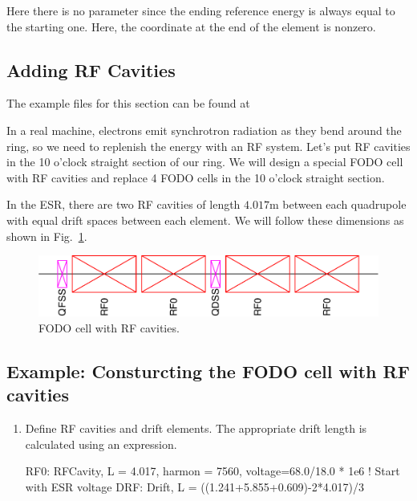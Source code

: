 \documentclass{hitec}     %
\begin{document}
{Here there is no  parameter since the ending reference energy is always equal to the
starting one. Here, the  coordinate at the end of the element is nonzero.

\subsection{Adding RF Cavities}

The example files for this section can be found at 

In a real machine, electrons emit synchrotron radiation as they bend around the ring, so we need to replenish the energy with an RF system. Let’s put RF cavities in the 10 o’clock straight section of our ring. We will design a special FODO cell with RF cavities  and replace 4 FODO cells in the 10 o’clock straight section. 

In the ESR, there are two RF cavities of length $4.017 \textrm{m}$ between each quadrupole with equal drift spaces between each element. We will follow these dimensions as shown in Fig.~\ref{f:fodorf}.

\begin{figure}[!h]
  \centering
  \includegraphics[width=0.9\linewidth]{figures/rf.pdf}
  \caption{FODO cell with RF cavities.}
  \label{f:fodorf}
\end{figure}

\subsection{Example: Consturcting the FODO cell with RF cavities}

\begin{enumerate}[leftmargin=*]
    \item Define RF cavities and drift elements. The appropriate drift length is calculated using an expression.
    \begin{code}
RF0: RFCavity, L = 4.017, harmon = 7560,
        voltage=68.0/18.0 * 1e6 ! Start with ESR voltage
DRF: Drift, L = ((1.241+5.855+0.609)-2*4.017)/3
    \end{code}
    

\end{enumerate}}
\end{document}
